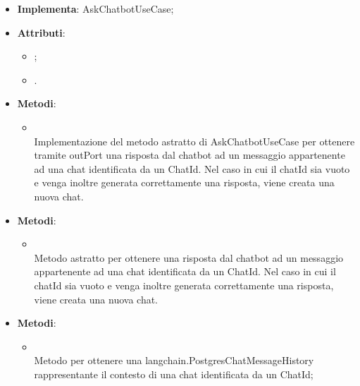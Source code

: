 \documentclass[10pt, a4paper]{article}
\begin{document}
\label{AskChatbotServiceDettaglio}
\begin{itemize}
    \item \textbf{Implementa}: AskChatbotUseCase;
    \item \textbf{Attributi}:
    \begin{itemize}
        \item {};
        \item {}.
    \end{itemize}
    \item \textbf{Metodi}:
    \begin{itemize}
        \item {}\\
        Implementazione del metodo astratto di AskChatbotUseCase per ottenere tramite outPort una risposta dal chatbot ad un messaggio appartenente ad una chat identificata da un ChatId. Nel caso in cui il chatId sia vuoto e venga inoltre generata correttamente una risposta, viene creata una nuova chat.
    \end{itemize}
\end{itemize}

\label{AskChatbotUseCaseDettaglio}
\begin{itemize}
    \item \textbf{Metodi}:
    \begin{itemize}
        \item {}\\
        Metodo astratto per ottenere una risposta dal chatbot ad un messaggio appartenente ad una chat identificata da un ChatId. Nel caso in cui il chatId sia vuoto e venga inoltre generata correttamente una risposta, viene creata una nuova chat.
    \end{itemize}
\end{itemize}

\label{ChatHistoryManagerDettaglio}
\begin{itemize}
    \item \textbf{Metodi}:
    \begin{itemize}
        \item {}\\
        Metodo per ottenere una langchain.PostgresChatMessageHistory rappresentante il contesto di una chat identificata da un ChatId;
    \end{itemize}
\end{itemize}
\end{document}

